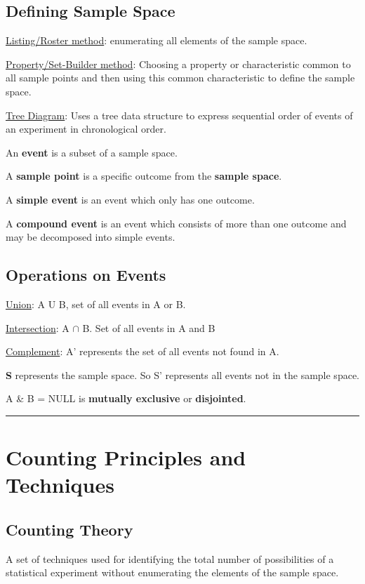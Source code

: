 \documentclass[11pt]{article}
\begin{document}
\subsection{\textbf{Defining Sample Space}}
\label{sec:org3da2178}

\uline{Listing/Roster method}: enumerating all elements of the sample space.

\uline{Property/Set-Builder method}: Choosing a property or characteristic common to all sample points and then using this common characteristic to define the sample space.

\uline{Tree Diagram}: Uses a tree data structure to express sequential order of events of an experiment in chronological order.

An \textbf{event} is a subset of a sample space.

A \textbf{sample point} is a specific outcome from the \textbf{sample space}.

A \textbf{simple event} is an event which only has one outcome.

A \textbf{compound event} is an event which consists of more than one outcome and may be decomposed into simple events.
\subsection{\textbf{Operations on Events}}
\label{sec:org3e50bd5}

\uline{Union}: A U B, set of all events in A or B.

\uline{Intersection}: A \(\cap\) B. Set of all events in A and B

\uline{Complement}: A' represents the set of all events not found in A.

\textbf{S} represents the sample space. So S' represents all events not in the sample space.

A \& B = NULL is \textbf{mutually exclusive} or \textbf{disjointed}.

\noindent\rule{\textwidth}{0.5pt}
\section{Counting Principles and Techniques}
\label{sec:org8e387f3}

\subsection{Counting Theory}
\label{sec:org419d6b0}
A set of techniques used for identifying the total number of possibilities of a statistical experiment without enumerating the elements of the sample space.
\end{document}
